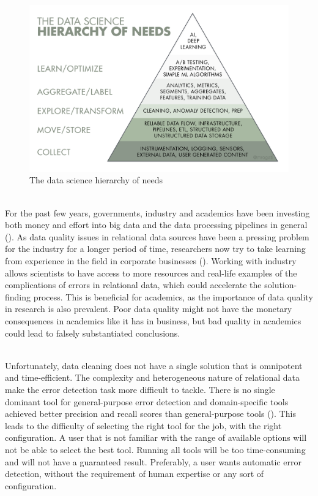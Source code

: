 \begin{figure}
    \centering
    \includegraphics[width=\linewidth]{thesis/Figures/PyramidData.png}
    \caption[The data science hierarchy of needs]{The data science hierarchy of needs\footnotemark}
    \label{fig:pyramid_data}
\end{figure}

~\\For the past few years, governments, industry and academics have been investing both money and effort into big data and the data processing pipelines in general (\cite{Cai2015-hr}). As data quality issues in relational data sources have been a pressing problem for the industry for a longer period of time, researchers now try to take learning from experience in the field in corporate businesses (\cite{Stonebraker2018-ag}). Working with industry allows scientists to have access to more resources and real-life examples of the complications of errors in relational data, which could accelerate the solution-finding process. This is beneficial for academics, as the importance of data quality in research is also prevalent. Poor data quality might not have the monetary consequences in academics like it has in business, but bad quality in academics could lead to falsely substantiated conclusions. 

~\\Unfortunately, data cleaning does not have a single solution that is omnipotent and time-efficient. The complexity and heterogeneous nature of relational data make the error detection task more difficult to tackle. There is no single dominant tool for general-purpose error detection and domain-specific tools achieved better precision and recall scores than general-purpose tools (\cite{Abedjan2016-jc}). 
This leads to the difficulty of selecting the right tool for the job, with the right configuration. A user that is not familiar with the range of available options will not be able to select the best tool. Running all tools will be too time-consuming and will not have a guaranteed result. Preferably, a user wants automatic error detection, without the requirement of human expertise or any sort of configuration.

